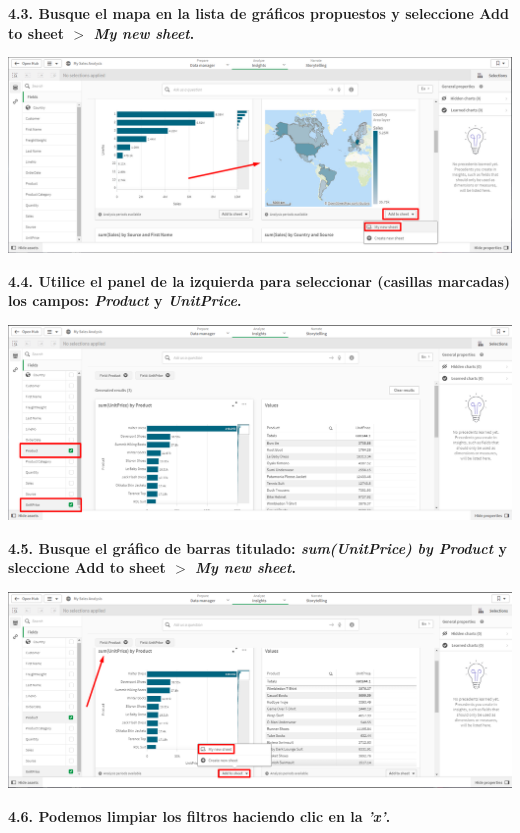 \documentclass{article}
\begin{document}
\textbf{4.3. Busque el mapa en la lista de gráficos
 propuestos y seleccione \textbf{Add to sheet} $>$ \textit{My new sheet}.}

    \begin{center}
		\includegraphics[width=14cm]{./images/9} 
	\end{center}
\newpage
\textbf{4.4. Utilice el panel de la izquierda
 para seleccionar (casillas marcadas) los campos:
 \textit{Product} y \textit{UnitPrice}.}

    \begin{center}
		\includegraphics[width=14cm]{./images/10} 
	\end{center}
	
\textbf{4.5. Busque el gráfico de barras
 titulado: \textit{sum(UnitPrice) by Product} y sleccione 
\textbf{Add to sheet} $>$  \textit{My new sheet}.}

    \begin{center}
		\includegraphics[width=14cm]{./images/10.1} 
	\end{center}
\newpage
\textbf{4.6. Podemos limpiar los 
filtros haciendo clic en la \textit{\textbf{'x'}}.}
\end{document}

